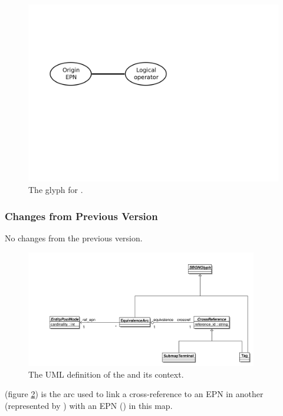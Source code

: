 \begin{figure}[htb]
  \centering
  \includegraphics[scale = 0.4]{images/logicArc}
  \caption{The \PD glyph for .}
  \label{fig:techref:logicArc}
\end{figure}

\subsubsection{Changes from Previous Version}

No changes from the previous version.

\label{defn:EquivalenceArc}

\begin{figure}[htb]
  \centering
  \includegraphics[width = 0.9\textwidth]{images/equivalencearcuml}
  \caption{The UML definition of the  and its context.}
  \label{fig:techref:equivalencearcuml}
\end{figure}


 (figure \ref{fig:techref:equivalencearcuml}) is the arc used to link a cross-reference
to an EPN in another \PDm (represented by )
with an EPN () in this map.

